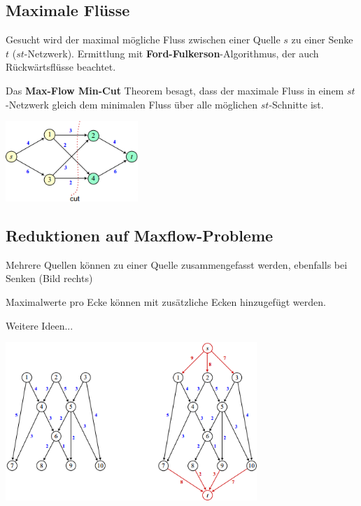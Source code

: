 \subsection{Maximale Flüsse }
  \begin{minipage}{13.7cm}
    Gesucht wird der maximal mögliche Fluss zwischen einer Quelle $s$ zu einer Senke $t$ ($st$-Netzwerk). Ermittlung mit \textbf{Ford-Fulkerson}-Algorithmus, der auch Rückwärtsflüsse beachtet.
    
    Das \textbf{Max-Flow Min-Cut} Theorem besagt, dass der maximale Fluss in einem $st$-Netzwerk gleich dem minimalen Fluss über alle möglichen $st$-Schnitte ist.
  \end{minipage}
  \begin{minipage}{5cm}
    \includegraphics[width=5cm]{./Content/GraphsAndNetworks/max-flow-min-cut}
  \end{minipage}

\subsection{Reduktionen auf Maxflow-Probleme }
  \begin{minipage}{9.5cm}
    \begin{liste}
      \item Mehrere Quellen können zu einer Quelle zusammengefasst werden, ebenfalls bei Senken (Bild rechts)
      \item Maximalwerte pro Ecke können mit zusätzliche Ecken hinzugefügt werden.
      \item Weitere Ideen...
    \end{liste}
  \end{minipage}
  \begin{minipage}{9.5cm}
    \includegraphics[width=9.5cm]{./Content/GraphsAndNetworks/maxflow-reduktion}
  \end{minipage}